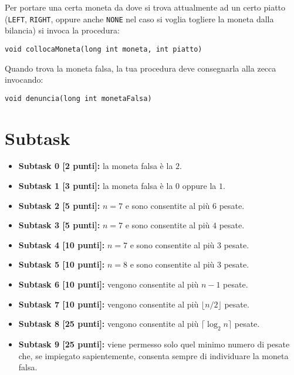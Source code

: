 \documentclass[a4paper,11pt]{article}
\begin{document}
  \noindent
  Per portare una certa moneta da dove si trova attualmente ad un certo piatto
  (\texttt{LEFT}, \texttt{RIGHT}, oppure anche \texttt{NONE} nel caso si voglia
   togliere la moneta dalla bilancia)
   si invoca la procedura:

  \vspace{0.2cm}

  \noindent
  \texttt{void collocaMoneta(long int moneta, int piatto)}

  \vspace{0.2cm}

  \noindent
  Quando trova la moneta falsa, la tua procedura deve consegnarla
  alla zecca invocando:
  
  \vspace{0.2cm}
  
  \noindent
  \texttt{void denuncia(long int monetaFalsa)}
  
  
  \section*{Subtask}
  \begin{itemize}
    \item \textbf{Subtask 0 [2 punti]:} la moneta falsa è la $2$.
    \item \textbf{Subtask 1 [3 punti]:} la moneta falsa è la $0$ oppure la $1$.
    \item \textbf{Subtask 2 [5 punti]:} $n=7$ e sono consentite al pi\`u $6$ pesate.
    \item \textbf{Subtask 3 [5 punti]:} $n=7$ e sono consentite al pi\`u $4$ pesate.
    \item \textbf{Subtask 4 [10 punti]:} $n=7$ e sono consentite al pi\`u $3$ pesate.
    \item \textbf{Subtask 5 [10 punti]:} $n=8$ e sono consentite al pi\`u $3$ pesate.
    \item \textbf{Subtask 6 [10 punti]:} vengono consentite al pi\`u $n-1$ pesate.
    \item \textbf{Subtask 7 [10 punti]:} vengono consentite al pi\`u $\lfloor n/2 \rfloor$ pesate.
    \item \textbf{Subtask 8 [25 punti]:} vengono consentite al pi\`u $\lceil \log_2 n \rceil$ pesate.
    \item \textbf{Subtask 9 [25 punti]:} viene permesso solo quel minimo numero di pesate che, se impiegato sapientemente, consenta sempre di individuare la moneta falsa.
  \end{itemize}
  
\end{document}
